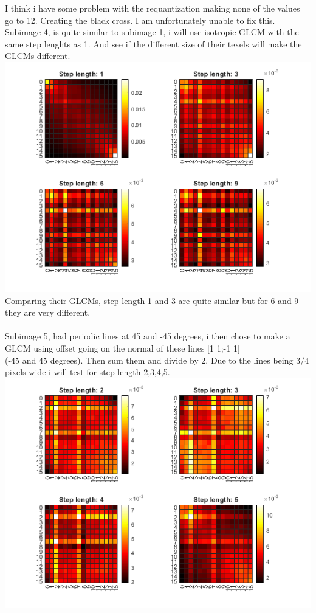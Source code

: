 \documentclass[12pt, letterpaper, twoside]{article}
\begin{document}
I think i have some problem with the requantization making none of the values go to 12.
Creating the black cross. I am unfortunately unable to fix this. 
\newpage
\ \\
Subimage 4, is quite similar to subimage 1, i will use isotropic GLCM with the same step lenghts as 1.
And see if the different size of their texels will make the GLCMs different.\\  
\includegraphics[scale=1]{"glcm4.png"}\\
Comparing their GLCMs, step length 1 and 3 are quite similar but for 6 and 9 they are very different.\\
\newpage
\ \\
Subimage 5, had periodic lines at 45 and -45 degrees, i then chose to make a GLCM using offset going on the normal of these lines [1 1;-1 1]\\
(-45 and 45 degrees). Then sum them and divide by 2. Due to the lines being 3/4 pixels wide i will test for step length 2,3,4,5.\\ 
\includegraphics[scale=1]{"glcm5.png"}\\
\end{document}
